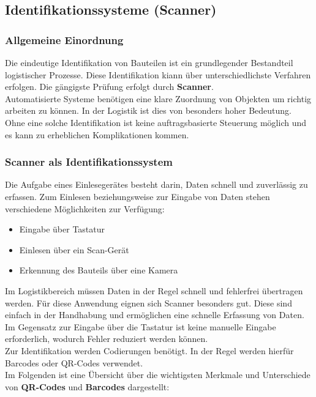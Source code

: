 \subsection{Identifikationssysteme (Scanner)}
\subsubsection{Allgemeine Einordnung}
Die eindeutige Identifikation von Bauteilen ist ein grundlegender Bestandteil logistischer Prozesse. Diese Identifikation kiann über unterschiedlichste Verfahren erfolgen. Die gängigste Prüfung erfolgt durch \textbf{Scanner}.\\
Automatisierte Systeme benötigen eine klare Zuordnung von Objekten um richtig arbeiten zu können. In der Logistik ist dies von besonders hoher Bedeutung.\\
Ohne eine solche Identifikation ist keine auftragsbasierte Steuerung möglich und es kann zu erheblichen Komplikationen kommen.
\subsubsection{Scanner als Identifikationssystem}

Die Aufgabe eines Einlesegerätes besteht darin, Daten schnell und zuverlässig zu erfassen. Zum Einlesen beziehungsweise zur Eingabe von Daten stehen verschiedene Möglichkeiten zur Verfügung:
\begin{itemize}
	\item Eingabe über Tastatur 
	\item Einlesen über ein Scan-Gerät
	\item Erkennung des Bauteils über eine Kamera
\end{itemize}

Im Logistikbereich müssen Daten in der Regel schnell und fehlerfrei übertragen werden. Für diese Anwendung eignen sich Scanner besonders gut. Diese sind einfach in der Handhabung und ermöglichen eine schnelle Erfassung von Daten. Im Gegensatz zur Eingabe über die Tastatur ist keine manuelle Eingabe erforderlich, wodurch Fehler reduziert werden können.\\

Zur Identifikation werden Codierungen benötigt. In der Regel werden hierfür Barcodes oder QR-Codes verwendet.\\
Im Folgenden ist eine Übersicht über die wichtigsten Merkmale und Unterschiede von \textbf{QR-Codes} und \textbf{Barcodes} dargestellt:

